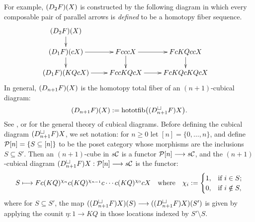 \documentclass[11pt]{amsart}
\theoremstyle{plain}
\newcommand{\dupdown}[2]{D_{\smash{#1}}}
\begin{document}
For example, $(\dupdown{2}{c}F)(X)$ is constructed by the following diagram in which every composable pair of parallel arrows is \emph{defined} to be a homotopy fiber sequence.
\[\def\labelstyle{\scriptstyle}
\xymatrix@!0@R=30pt@C=43pt{
(\dupdown{2}{c}F)(X)\ar[d]\\
(\dupdown{1}{c}F)(cX) \ar[rr]\ar[d]         &           &FcccX \ar[rr]\ar[d]         &           &   FcKQccX            \ar[d]  &                  \\
(\dupdown{1}{c}F)(KQcX) \ar[rr] &                     &  FccKQcX \ar[rr] &             & FcKQcKQcX
}\]
In general, $(\dupdown{n+1}{c}F)(X)$ is the homotopy total fiber of an $(n+1)$-cubical diagram:
\[(\dupdown{n+1}{c}F)(X):=\textup{hototfib} \bigl(({D}_{n+1}^{\smash{\square}}F)X\bigr).\]
See \cite{GoodwillieCalcII}, \cite{LuisGoodwillie.pdf} or \cite{CubicalHomotopyTheory.pdf} for the general theory of cubical diagrams. Before defining the cubical diagram $({D}_{n+1}^{\smash{\square}}F)X$, we set notation: for $n\geq0$ let $[n]=\{0,\ldots,n\}$, and define $\calP[n]=\left\{S\subseteq [n]\right\}$ to be the poset category whose morphisms are the inclusions $S\subseteq S'$.
Then an $(n+1)$-cube in $s\calC$ is a functor $\calP[n]\to s\calC$, and the %
$(n+1)$-cubical diagram $({D}_{n+1}^{\smash{\square}}F)X:\calP[n]\to s\calC$ is the functor:
\[S\mapsto Fc(KQ)^{\chi_{n}}c(KQ)^{\chi_{n-1}}c\cdots c(KQ)^{\chi_0}cX\quad \textup{where}\quad \chi_i:=\begin{cases}
1,&\textup{if }i\in S;\\
0,&\textup{if }i\notin S,
\end{cases}
\]
where for $S\subseteq S'$, the map $(({D}_{n+1}^{\smash{\square}}F)X)(S)\to (({D}_{n+1}^{\smash{\square}}F)X)(S')$ is given by applying the counit $\eta:1\to KQ$ in those locations indexed by $S'\setminus S$.

\end{document}
